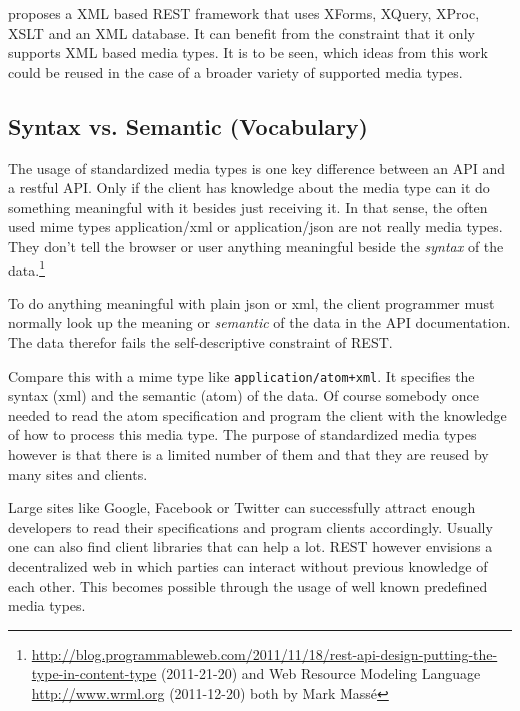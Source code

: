 \documentclass[12pt,a4paper]{scrartcl}		%
\newcommand{\citeurl}[2]{\url{#1} (#2)}
\begin{document}
\cite{Davis:2011:XTR:1967428.1967437} proposes a XML based REST framework that uses XForms, XQuery, XProc, XSLT and an XML database. It can benefit from the constraint that it only supports XML based media types. It is to be seen, which ideas from this work could be reused in the case of a broader variety of supported media types.

\subsection{Syntax vs. Semantic (Vocabulary)}

The usage of standardized media types is one key difference between an API and a
restful API. \cite[sec. 5.2.1.2]{Fielding2000} Only if the client has knowledge
about the media type can it do something meaningful with it besides just
receiving it. In that sense, the often used mime types application/xml or
application/json are not really media types. They don't tell the browser or user
anything meaningful beside the \emph{syntax} of the data.\footnote{
\citeurl{http://blog.programmableweb.com/2011/11/18/rest-api-design-putting-the-type-in-content-type}{2011-21-20}
and Web Resource Modeling Language \citeurl{http://www.wrml.org}{2011-12-20} both by Mark Massé
}

To do anything meaningful with plain json or xml, the client programmer must
normally look up the meaning or \emph{semantic} of the data in the API
documentation. The data therefor fails the self-descriptive constraint of
REST.

Compare this with a mime type like \texttt{application/atom+xml}. It specifies
the syntax (xml) and the semantic (atom) of the data. Of course somebody once
needed to read the atom specification and program the client with the knowledge
of how to process this media type. The purpose of standardized media types
however is that there is a limited number of them and that they are reused by many
sites and clients.

Large sites like Google, Facebook or Twitter can successfully attract enough
developers to read their specifications and program clients accordingly. Usually
one can also find client libraries that can help a lot. REST however envisions a
decentralized web in which parties can interact without previous knowledge of
each other. This becomes possible through the usage of well known predefined
media types.

\end{document}
